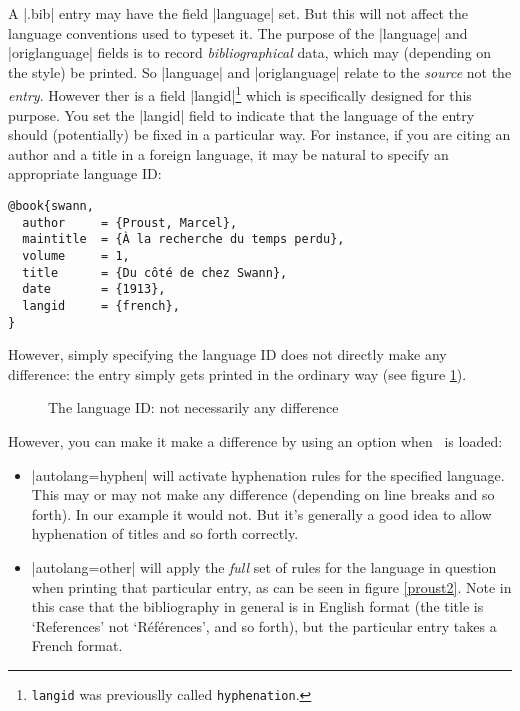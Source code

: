 A |.bib| entry may have the field |language| set. But this will not
affect the language conventions used to typeset it. The purpose of the
|language| and |origlanguage| fields is to record
\emph{bibliographical} data, which may (depending on the style) be
printed. So |language| and
|origlanguage| relate to the \emph{source} not the
\emph{entry}. However ther is a field
|langid|\footnote{\texttt{langid} was previouslly called
  \texttt{hyphenation}.} which is specifically designed for this
purpose. You set the |langid| field to indicate that the language of
the entry should (potentially) be fixed in a particular way. For
instance, if you are citing an author and a title in a foreign
language, it may be natural to specify an appropriate language ID:

\begin{verbatim}
@book{swann,
  author     = {Proust, Marcel},
  maintitle  = {À la recherche du temps perdu},
  volume     = 1,
  title      = {Du côté de chez Swann},
  date       = {1913},
  langid     = {french},
}
\end{verbatim}

However, simply specifying the language ID does not directly make any
difference: the entry simply gets printed in the ordinary way (see
figure \ref{proust1}).
\begin{figure}
\caption{The language ID: not necessarily any difference\label{proust1}}
\end{figure}

However, you can make it make a difference by using an option when \biblatex\ is loaded:
\begin{itemize}
\item |autolang=hyphen| will activate hyphenation rules for the
  specified language. This may or may not make any difference
  (depending on line breaks and so forth). In our example it would
  not. But it's generally a good idea to allow hyphenation of titles
  and so forth correctly.
\item |autolang=other| will apply the \emph{full} set of rules for the
  language in question when printing that particular entry, as can be
  seen in figure \ref{proust2}. Note in this case that the
  bibliography in general is in English format (the title is
  `References' not `Références', and so forth), but the particular
  entry takes a French format.
\end{itemize}

